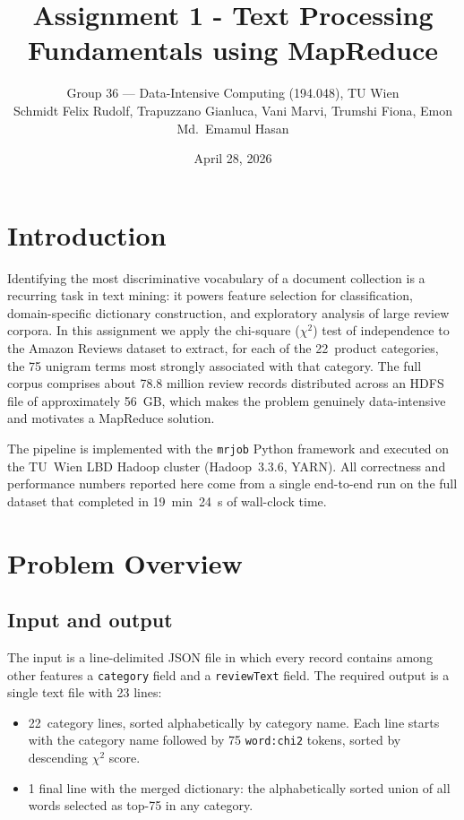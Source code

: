 \documentclass[11pt,a4paper]{article}
\title{Assignment 1 - Text Processing Fundamentals using MapReduce}
\author{Group 36 --- Data-Intensive Computing (194.048), TU Wien\\
        \small Schmidt Felix Rudolf, Trapuzzano Gianluca, Vani Marvi,
        Trumshi Fiona, Emon Md.~Emamul Hasan}
\date{April 28, 2026}
\begin{document}
\maketitle

\section{Introduction}

Identifying the most discriminative vocabulary of a document collection is a
recurring task in text mining: it powers feature selection for classification,
domain-specific dictionary construction, and exploratory analysis of large
review corpora.  In this assignment we apply the chi-square ($\chi^{2}$) test
of independence to the Amazon Reviews dataset to extract, for each of the
22~product categories, the 75 unigram terms most strongly associated with
that category.  The full corpus comprises about 78.8 million review records
distributed across an HDFS file of approximately 56~GB, which makes the
problem genuinely data-intensive and motivates a MapReduce solution.

The pipeline is implemented with the \texttt{mrjob} Python framework and
executed on the TU~Wien LBD Hadoop cluster (Hadoop~3.3.6, YARN). All
correctness and performance numbers reported here come from a single end-to-end
run on the full dataset that completed in 19~min~24~s of wall-clock time.

\section{Problem Overview}

\subsection*{Input and output}

The input is a line-delimited JSON file in which every record contains among other features a \texttt{category} field and a \texttt{reviewText} field. The required
output is a single text file with 23 lines:

\begin{itemize}[leftmargin=*,nosep]
  \item 22~category lines, sorted alphabetically by category name. Each line
        starts with the category name followed by 75 \texttt{word:chi2}
        tokens, sorted by descending $\chi^{2}$ score.
  \item 1 final line with the merged dictionary: the alphabetically sorted
        union of all words selected as top-75 in any category.
\end{itemize}
\end{document}
